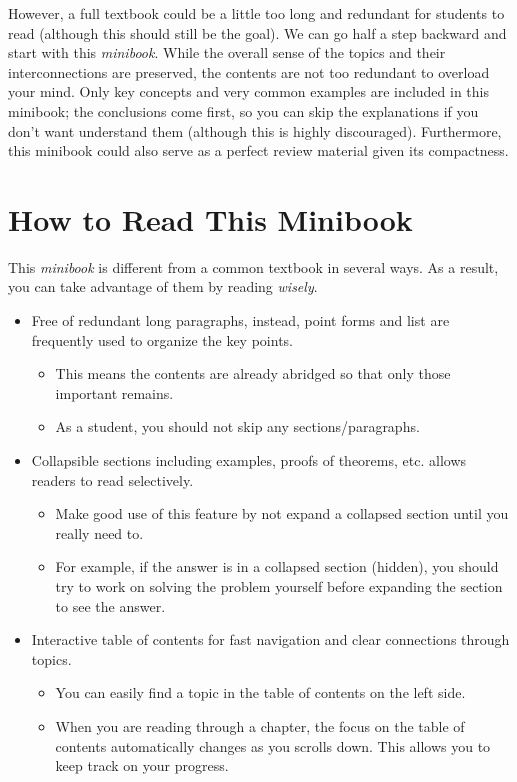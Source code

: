 \documentclass[
]{book}
\providecommand{\tightlist}{%
  \setlength{\itemsep}{0pt}\setlength{\parskip}{0pt}}
\theoremstyle{definition}
\theoremstyle{definition}
\theoremstyle{definition}
\theoremstyle{definition}
\theoremstyle{remark}
\begin{document}
However, a full textbook could be a little too long and redundant for students to read (although this should still be the goal). We can go half a step backward and start with this \emph{minibook}. While the overall sense of the topics and their interconnections are preserved, the contents are not too redundant to overload your mind. Only key concepts and very common examples are included in this minibook; the conclusions come first, so you can skip the explanations if you don't want understand them (although this is highly discouraged). Furthermore, this minibook could also serve as a perfect review material given its compactness.

\hypertarget{how-to-read-this-minibook}{%
\section*{How to Read This Minibook}\label{how-to-read-this-minibook}}

This \emph{minibook} is different from a common textbook in several ways. As a result, you can take advantage of them by reading \emph{wisely}.

\begin{itemize}
\tightlist
\item
  Free of redundant long paragraphs, instead, point forms and list are frequently used to organize the key points.

  \begin{itemize}
  \tightlist
  \item
    This means the contents are already abridged so that only those important remains.
  \item
    As a student, you should not skip any sections/paragraphs.
  \end{itemize}
\item
  Collapsible sections including examples, proofs of theorems, etc. allows readers to read selectively.

  \begin{itemize}
  \tightlist
  \item
    Make good use of this feature by not expand a collapsed section until you really need to.
  \item
    For example, if the answer is in a collapsed section (hidden), you should try to work on solving the problem yourself before expanding the section to see the answer.
  \end{itemize}
\item
  Interactive table of contents for fast navigation and clear connections through topics.

  \begin{itemize}
  \tightlist
  \item
    You can easily find a topic in the table of contents on the left side.
  \item
    When you are reading through a chapter, the focus on the table of contents automatically changes as you scrolls down. This allows you to keep track on your progress.
  \end{itemize}
\end{itemize}
\end{document}
